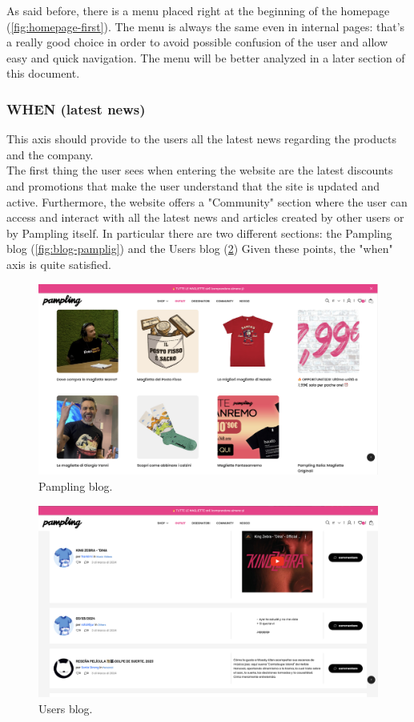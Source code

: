 As said before, there is a menu placed right at the beginning of the homepage (\cref{fig:homepage-first}).  
The menu is always the same even in internal pages: that's a really good choice in order to avoid possible confusion of the user and allow easy and quick navigation.
The menu will be better analyzed in a later section of this document.


\subsubsection{WHEN (latest news)} 
This axis should provide to the users all the latest news regarding the products and the company.\\

The first thing the user sees when entering the website are the latest discounts and promotions that make the user understand that the site is updated and active.
Furthermore, the website offers a "Community" section where the user can access and interact with all the latest news and articles created by other users or by Pampling itself.
In particular there are two different sections: the Pampling blog (\cref{fig:blog-pamplig}) and the Users blog (\cref{fig:blog-users})
Given these points, the "when" axis is quite satisfied.

\begin{figure}[h!]
	\centering
	\includegraphics[scale=0.225]{images/blog-pampling.png}
	\caption{Pampling blog.}
	\label{fig:blog-pampling}
\end{figure}

\begin{figure}[h!]
	\centering
	\includegraphics[scale=0.225]{images/blog-users.png}
	\caption{Users blog.}
	\label{fig:blog-users}
\end{figure}


